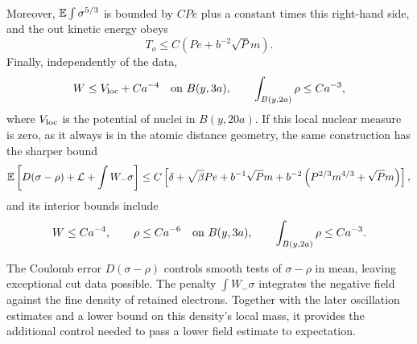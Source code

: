 \begin{lemma}
\begin{align}
\end{align}
Moreover, $\mathbb E\int\sigma^{5/3}$ is bounded by $CPe$ plus a constant
times this right-hand side, and the out kinetic energy obeys
\begin{equation}\label{m:eq:screen-out-kinetic}
 T_o\le C\left(Pe+b^{-2}\sqrt Pm\right).
\end{equation}
Finally, independently of the data,
\begin{equation}\label{m:eq:screen-interior-upper}
 W\le V_{\rm loc}+Ca^{-4}\quad\hbox{on }B(y,3a),\qquad
 \int_{B(y,2a)}\rho\le Ca^{-3},
\end{equation}
where $V_{\rm loc}$ is the potential of nuclei in $B(y,20a)$.
If this local nuclear measure is zero, as it always is in the atomic
distance geometry, the same construction has the sharper bound
\begin{equation}\label{a:eq:screen-patch}
 \mathbb E\left[D(\sigma-\rho)+\mathcal L+\int W_-\sigma\right]
 \le C\left[\delta+\sqrt\beta Pe+b^{-1}\sqrt Pm
       +b^{-2}\left(P^{2/3}m^{4/3}+\sqrt Pm\right)\right],
\end{equation}
and its interior bounds include
\begin{equation}\label{a:eq:screen-interior}
 W\le Ca^{-4},\qquad \rho\le Ca^{-6}
       \quad\hbox{on }B(y,3a),\qquad
 \int_{B(y,2a)}\rho\le Ca^{-3}.
\end{equation}
\end{lemma}

The Coulomb error $D(\sigma-\rho)$ controls smooth tests of
$\sigma-\rho$ in mean, leaving exceptional cut data possible.  The
penalty $\int W_-\sigma$ integrates the negative field against the
fine density of retained electrons.
Together with the later oscillation estimates and a lower bound on
this density's local mass, it provides the additional control needed
to pass a lower field estimate to expectation.

